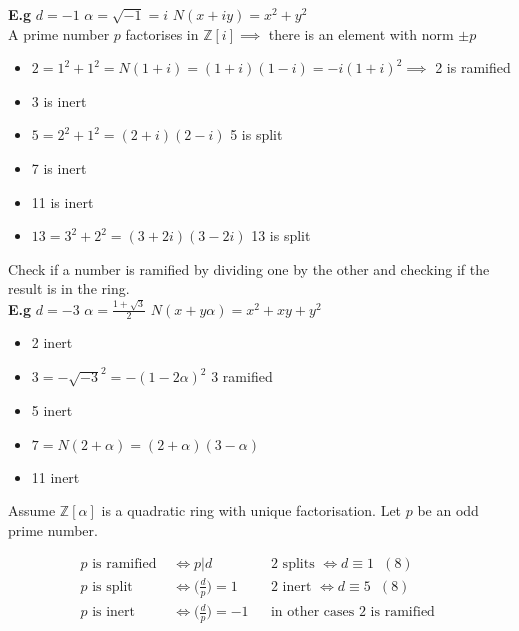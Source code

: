 \documentclass[11pt]{article}
\begin{document}
\textbf{E.g} $d=-1 $\hspace{7pt}  $\alpha = \sqrt{-1} = i $\hspace{7pt} $N(x+iy)=x^2+y^2$\\[1em]

A prime number $p$ factorises in $\mathbb{Z}[i] \implies $ there is an element with norm $\pm p$


\begin{itemize}
	\item{$2 = 1^2+1^2= N(1+i) = (1+i)(1-i) = -i (1+i)^2  \implies $ 2 is ramified } 
	\item{$3$ is inert}
	\item{$5 = 2^2 + 1^2 = (2+i)(2-i) $ 5 is split}
	\item{7 is inert}
	\item{11 is inert}
	\item{$13 = 3^2 + 2^2 = (3+2i)(3-2i)$ 13 is split}
\end{itemize}

Check if a number is ramified by dividing one by the other and checking if the result is in the ring.\\[1em]

\textbf{E.g } $d=-3 $ \hspace{7pt} $\alpha = \frac{1+\sqrt{3}}{2} $ \hspace{7pt} $N(x+y\alpha) = x^2 +xy+y^2$


\begin{itemize}
	\item{2 inert}
	\item{$3= - \sqrt{-3}^2 = -(1-2\alpha)^2 $ 3 ramified}
	\item{5 inert}
	\item{$7 = N(2+\alpha) = (2+\alpha)(3-\alpha) $ }
	\item{11 inert}
\end{itemize}


Assume $\mathbb{Z}[\alpha]$ is a quadratic ring with unique factorisation. Let $p$ be an odd prime number.


\begin{align*}
	p \text{ is ramified } &\iff p|d && 2 \text{ splits } \iff d \equiv 1 \hspace{7pt} (8) \\
	p \text{ is split } &\iff \Big(\frac{d}{p}\Big) = 1 && 2 \text{ inert } \iff d \equiv 5\hspace{7pt}(8) \\
	p \text{ is inert } &\iff \Big(\frac{d}{p}\Big) = -1 && \text{in other cases 2 is ramified } \\
\end{align*}
\newpage
\end{document}
